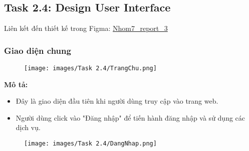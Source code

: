 \subsection{Task 2.4: Design User Interface}
    Liên kết đến thiết kế trong Figma: \href{https://www.figma.com/file/iKigk9Qx8GSMj3kLY0gqzQ/Nhom7_report_3?type=design&node-id=0%3A1&mode=design&t=Ja6DS4vqBqHGVIOn-1}{Nhom7\_report\_3}
    \subsubsection{Giao diện chung}
    \begin{center}
    \begin{figure}[!htp]
    \begin{center}
     \texttt{[image: images/Task 2.4/TrangChu.png]}
    \end{center}
    \label{refhinh1}
    \end{figure}
    \end{center}
    \textbf{Mô tả:}
    \begin{itemize}
    \item Đây là giao diện đầu tiên khi người dùng truy cập vào trang web.
    \item Người dùng click vào "Đăng nhập" để tiến hành đăng nhập và sử dụng các dịch vụ.
    \end{itemize}

    \newpage
    \begin{center}
    \begin{figure}[!htp]
    \begin{center}
     \texttt{[image: images/Task 2.4/DangNhap.png]}
    \end{center}
    \label{refhinh1}
    \end{figure}
    \end{center}

